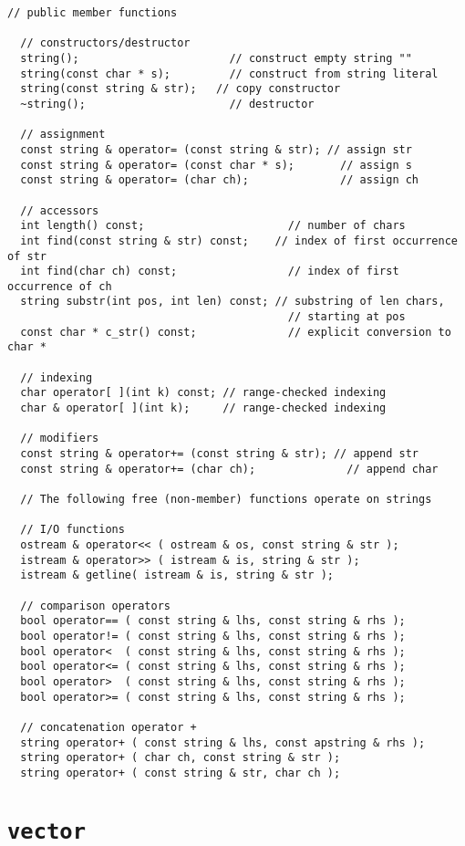 \begin{lstlisting}
// public member functions

  // constructors/destructor
  string();                       // construct empty string ""
  string(const char * s);         // construct from string literal
  string(const string & str);   // copy constructor
  ~string();                      // destructor

  // assignment
  const string & operator= (const string & str); // assign str
  const string & operator= (const char * s);       // assign s
  const string & operator= (char ch);              // assign ch

  // accessors
  int length() const;                      // number of chars
  int find(const string & str) const;    // index of first occurrence of str
  int find(char ch) const;                 // index of first occurrence of ch
  string substr(int pos, int len) const; // substring of len chars, 
                                           // starting at pos
  const char * c_str() const;              // explicit conversion to char *

  // indexing
  char operator[ ](int k) const; // range-checked indexing
  char & operator[ ](int k);     // range-checked indexing

  // modifiers
  const string & operator+= (const string & str); // append str
  const string & operator+= (char ch);              // append char

  // The following free (non-member) functions operate on strings

  // I/O functions
  ostream & operator<< ( ostream & os, const string & str );
  istream & operator>> ( istream & is, string & str );
  istream & getline( istream & is, string & str );

  // comparison operators
  bool operator== ( const string & lhs, const string & rhs );
  bool operator!= ( const string & lhs, const string & rhs );
  bool operator<  ( const string & lhs, const string & rhs );
  bool operator<= ( const string & lhs, const string & rhs );
  bool operator>  ( const string & lhs, const string & rhs );
  bool operator>= ( const string & lhs, const string & rhs );

  // concatenation operator +
  string operator+ ( const string & lhs, const apstring & rhs );
  string operator+ ( char ch, const string & str );
  string operator+ ( const string & str, char ch );
\end{lstlisting}

\section{{\tt vector}}

